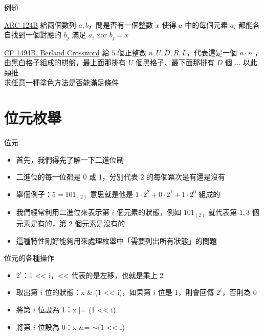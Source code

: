 \documentclass[aspectratio=169]{beamer}
\begin{document}
    \begin{frame}{例題}
        \begin{block}{\href{https://atcoder.jp/contests/arc124/tasks/arc124_b}{ARC 124B}}
            給兩個數列 $a, b$，問是否有一個整數 $x$ 使得 $a$ 中的每個元素 $a_i$ 都能各自找到一個對應的 $b_j$ 滿足 $a_i \text{ xor } b_j = x$
        \end{block}

        \begin{block}{\href{https://codeforces.com/problemset/problem/1494/B}{CF 1494B. Berland Crossword}}
            給 $5$ 個正整數 $n, U, D, R, L$，代表這是一個 $n \cdot n$ ，由黑白格子組成的棋盤，最上面那排有 $U$ 個黑格子、最下面那排有 $D$ 個 $\dots$ 以此類推\\
            求任意一種塗色方法是否能滿足條件
        \end{block}
    \end{frame}

    \section{位元枚舉}

    \begin{frame}{位元}
        \begin{itemize}
            \item<1-> 首先，我們得先了解一下二進位制
            \item<1-> 二進位的每一位都是 0 或 1，分別代表 2 的每個冪次是有還是沒有
            \item<1-> 舉個例子：$5 = 101_{(2)}$ 意思就是他是 $1 \cdot 2^2 + 0 \cdot 2^1 + 1 \cdot 2^0$ 組成的
            \item<2-> 我們經常利用二進位來表示第 $i$ 個元素的狀態，例如 $101_{(2)}$ 就代表第 $1, 3$ 個元素是有的，第 $2$ 個元素是沒有的
            \item<2-> 這種特性剛好能夠用來處理枚舉中「需要列出所有狀態」的問題
        \end{itemize}
    \end{frame}

    \begin{frame}{位元的各種操作}
        \begin{itemize}
            \item $2^i$：1 << i，<< 代表的是左移，也就是乘上 2
            \item 取出第 $i$ 位的狀態：x \& (1 << i)，如果第 $i$ 位是 1，則會回傳 $2^i$，否則為 $0$
            \item 將第 $i$ 位設為 1：x |= (1 << i)
            \item 將第 $i$ 位設為 0：x \&= $\sim$(1 << i)
        \end{itemize}
    \end{frame}
\end{document}
